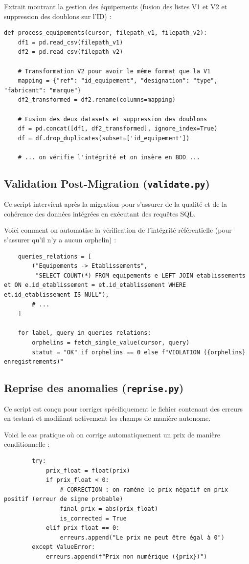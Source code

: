 \documentclass[12pt, a4paper]{article}
\begin{document}
Extrait montrant la gestion des équipements (fusion des listes V1 et V2 et suppression des doublons sur l'ID) :
\begin{lstlisting}
def process_equipements(cursor, filepath_v1, filepath_v2):
    df1 = pd.read_csv(filepath_v1)
    df2 = pd.read_csv(filepath_v2)
    
    # Transformation V2 pour avoir le même format que la V1
    mapping = {"ref": "id_equipement", "designation": "type", "fabricant": "marque"}
    df2_transformed = df2.rename(columns=mapping)
    
    # Fusion des deux datasets et suppression des doublons
    df = pd.concat([df1, df2_transformed], ignore_index=True)
    df = df.drop_duplicates(subset=['id_equipement'])
    
    # ... on vérifie l'intégrité et on insère en BDD ...
\end{lstlisting}

\subsection{Validation Post-Migration (\texttt{validate.py})}
Ce script intervient après la migration pour s'assurer de la qualité et de la cohérence des données intégrées en exécutant des requêtes SQL.

Voici comment on automatise la vérification de l'intégrité référentielle (pour s'assurer qu'il n'y a aucun orphelin) :
\begin{lstlisting}
    queries_relations = [
        ("Equipements -> Etablissements", 
         "SELECT COUNT(*) FROM equipements e LEFT JOIN etablissements et ON e.id_etablissement = et.id_etablissement WHERE et.id_etablissement IS NULL"),
        # ...
    ]
    
    for label, query in queries_relations:
        orphelins = fetch_single_value(cursor, query)
        statut = "OK" if orphelins == 0 else f"VIOLATION ({orphelins} enregistrements)"
\end{lstlisting}

\subsection{Reprise des anomalies (\texttt{reprise.py})}
Ce script est conçu pour corriger spécifiquement le fichier contenant des erreurs en testant et modifiant activement les champs de manière autonome.

Voici le cas pratique où on corrige automatiquement un prix de manière conditionnelle :
\begin{lstlisting}
        try:
            prix_float = float(prix)
            if prix_float < 0:
                # CORRECTION : on ramène le prix négatif en prix positif (erreur de signe probable)
                final_prix = abs(prix_float)
                is_corrected = True
            elif prix_float == 0:
                erreurs.append("Le prix ne peut être égal à 0")
        except ValueError:
            erreurs.append(f"Prix non numérique ({prix})")
\end{lstlisting}
\end{document}
